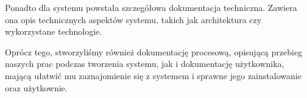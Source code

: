 \documentclass[polish,12pt]{aghthesis}
\begin{document}
Ponadto dla systemu powstała szczegółowa dokumentacja techniczna. Zawiera ona opis
technicznych aspektów systemu, takich jak architektura czy wykorzystane technologie.

Oprócz tego, stworzyliśmy również dokumentację procesową, opisującą przebieg naszych
prac podczas tworzenia systemu, jak i dokumentację użytkownika, mającą ułatwić mu 
zaznajomienie się z systemem i sprawne jego zainstalowanie oraz użytkownie. 


\nocite{artykul2011,ksiazka2011,narzedzie2011,projekt2011}


\end{document}
